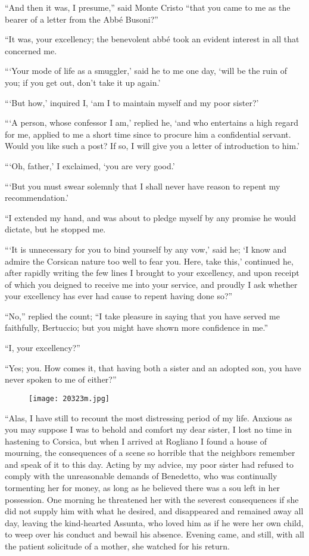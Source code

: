 “And then it was, I presume,” said Monte Cristo “that you came to me as
the bearer of a letter from the Abbé Busoni?”

“It was, your excellency; the benevolent abbé took an evident interest
in all that concerned me.

“‘Your mode of life as a smuggler,’ said he to me one day, ‘will be the
ruin of you; if you get out, don’t take it up again.’

“‘But how,’ inquired I, ‘am I to maintain myself and my poor sister?’

“‘A person, whose confessor I am,’ replied he, ‘and who entertains a
high regard for me, applied to me a short time since to procure him a
confidential servant. Would you like such a post? If so, I will give
you a letter of introduction to him.’

“‘Oh, father,’ I exclaimed, ‘you are very good.’

“‘But you must swear solemnly that I shall never have reason to repent
my recommendation.’

“I extended my hand, and was about to pledge myself by any promise he
would dictate, but he stopped me.

“‘It is unnecessary for you to bind yourself by any vow,’ said he; ‘I
know and admire the Corsican nature too well to fear you. Here, take
this,’ continued he, after rapidly writing the few lines I brought to
your excellency, and upon receipt of which you deigned to receive me
into your service, and proudly I ask whether your excellency has ever
had cause to repent having done so?”

“No,” replied the count; “I take pleasure in saying that you have
served me faithfully, Bertuccio; but you might have shown more
confidence in me.”

“I, your excellency?”

“Yes; you. How comes it, that having both a sister and an adopted son,
you have never spoken to me of either?”

\begin{figure}[ht]
\texttt{[image: 20323m.jpg]}
\end{figure}

“Alas, I have still to recount the most distressing period of my life.
Anxious as you may suppose I was to behold and comfort my dear sister,
I lost no time in hastening to Corsica, but when I arrived at Rogliano
I found a house of mourning, the consequences of a scene so horrible
that the neighbors remember and speak of it to this day. Acting by my
advice, my poor sister had refused to comply with the unreasonable
demands of Benedetto, who was continually tormenting her for money, as
long as he believed there was a sou left in her possession. One morning
he threatened her with the severest consequences if she did not supply
him with what he desired, and disappeared and remained away all day,
leaving the kind-hearted Assunta, who loved him as if he were her own
child, to weep over his conduct and bewail his absence. Evening came,
and still, with all the patient solicitude of a mother, she watched for
his return.

